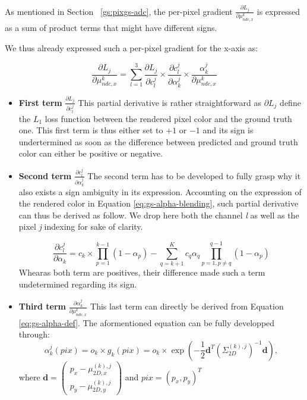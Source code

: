 As mentioned in Section ~\ref{gs:pixgs-adc}, the per-pixel gradient $\frac{\partial L_{j}}{\partial \mu^{k}_{ndc,x}}$ is expressed as a sum of product terms that might have different signs. 

We thus already expressed such a per-pixel gradient for the x-axis as: 

\begin{equation}
    \label{eq:perpix-grad-appendix}
    \frac{\partial L_{j}}{\partial \mu^{k}_{ndc,x}} = \sum \limits_{l=1}^{3} \frac{\partial L_{j}}{\partial c_{l}^{j}}\times \frac{\partial c_{l}^{j}}{\partial \alpha_{k}^{j}} \times \frac{\alpha_{k}^{j}}{\partial \mu^{k}_{ndc,x} }
    \end{equation}

\begin{itemize}
    
    \item \textbf{First term} $\frac{\partial L_{j}}{\partial c_{l}^{j}}$ 
This partial derivative is rather straightforward as $\partial L_{j}$ define the $L_{1}$ loss function between the rendered pixel color and the ground truth one. This first term is thus either set to $+1$ or $-1$ and its sign is undertermined as soon as the difference between predicted and ground truth color can either be positive or negative. 

    \item \textbf{Second term} $\frac{\partial c_{l}^{j}}{\partial \alpha_{k}^{j}}$ 
The second term has to be developed to fully grasp why it also exists a sign ambiguity in its expression. Accounting on the expression of the rendered color in Equation \eqref{eq:gs-alpha-blending}, such partial derivative can thus be derived as follow. We drop here both the channel  \textit{l} as well as the pixel \textit{j} indexing for sake of clarity.  

\begin{equation}
    \frac{\partial c_{l}^{j}}{\partial \alpha_{k}} = c_{k} \times \prod \limits_{p=1}^{k-1}(1 - \alpha_{p}) - \sum \limits_{q=k+1}^{K} c_{q}\alpha_{q}\prod \limits_{p=1,p\neq q}^{q-1}(1 - \alpha_{p})
\end{equation}
Whearas both term are positives, their difference made such a term undetermined regarding its sign. 

    \item \textbf{Third term} $\frac{\partial \alpha_{k}^{j}}{\partial \mu^{k}_{ndc,x}}$ 
This last term can directly be derived from Equation \eqref{eq:gs-alpha-def}. The aformentioned equation can be fully developped through: 
\begin{equation}
    \alpha_{k}^j(pix) =o_{k} \times g_{k}(pix) =  o_{k} \times \exp \left( -\frac{1}{2} \mathbf{d}^T \left( \Sigma_{2D}^{(k),j} \right)^{-1} \mathbf{d} \right),  
\end{equation}
where $\mathbf{d} = \begin{pmatrix}
    p_x - \mu_{2D,x}^{(k),j} \\
    p_y - \mu_{2D,y}^{(k),j}
\end{pmatrix}$ and $pix=\left( p_{x},p_{y}\right)^{T}$ 


\end{itemize}
